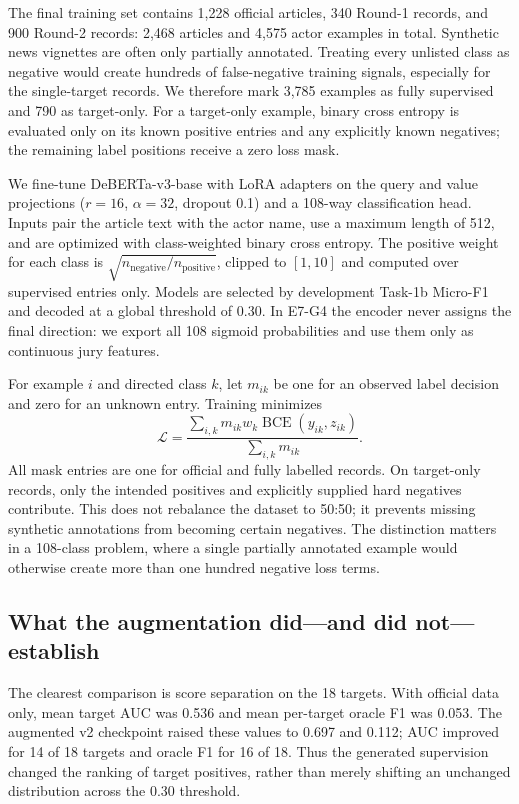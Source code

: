 \documentclass[sigconf,article,a4paper]{acmart}
\begin{document}
The final training set contains 1,228 official articles, 340 Round-1 records,
and 900 Round-2 records: 2,468 articles and 4,575 actor examples in total.
Synthetic news vignettes are often only partially annotated. Treating every
unlisted class as negative would create hundreds of false-negative training
signals, especially for the single-target records. We therefore mark 3,785
examples as fully supervised and 790 as target-only. For a target-only
example, binary cross entropy is evaluated only on its known positive entries
and any explicitly known negatives; the remaining label positions receive a
zero loss mask.

We fine-tune DeBERTa-v3-base with LoRA adapters on the query
and value projections ($r=16$, $\alpha=32$, dropout 0.1) and a 108-way
classification head. Inputs pair the article text with the actor name, use a
maximum length of 512, and are optimized with class-weighted binary cross
entropy. The positive weight for each class is
$\sqrt{n_{\mathrm{negative}}/n_{\mathrm{positive}}}$, clipped to $[1,10]$ and
computed over supervised entries only. Models are selected by development
Task-1b Micro-F1 and decoded at a global threshold of 0.30. In E7-G4 the
encoder never assigns the final direction: we export all 108 sigmoid
probabilities and use them only as continuous jury features.

For example $i$ and directed class $k$, let $m_{ik}$ be one for an observed
label decision and zero for an unknown entry. Training minimizes
\begin{equation}
\mathcal{L}=\frac{\sum_{i,k}m_{ik}w_k\operatorname{BCE}(y_{ik},z_{ik})}
{\sum_{i,k}m_{ik}}.
\end{equation}
All mask entries are one for official and fully labelled records. On
target-only records, only the intended positives and explicitly supplied hard
negatives contribute. This does not rebalance the dataset to 50:50; it prevents
missing synthetic annotations from becoming certain negatives. The distinction
matters in a 108-class problem, where a single partially annotated example
would otherwise create more than one hundred negative loss terms.

\subsection{What the augmentation did---and did not---establish}

The clearest comparison is score separation on the 18 targets.
With official data only, mean target AUC was 0.536 and mean per-target oracle
F1 was 0.053. The augmented v2 checkpoint raised these values to 0.697 and
0.112; AUC improved for 14 of 18 targets and oracle F1 for 16 of 18. Thus the
generated supervision changed the ranking of target positives, rather than
merely shifting an unchanged distribution across the 0.30 threshold.
\end{document}

